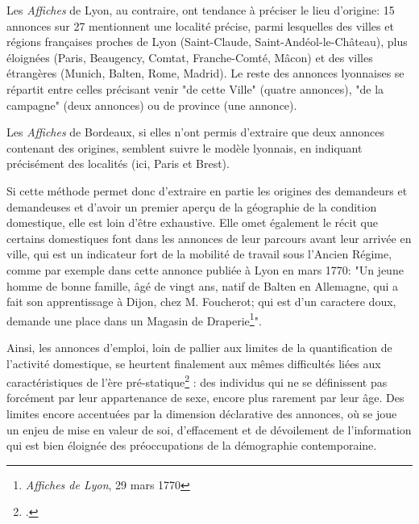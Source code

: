 Les\textit{ Affiches} de Lyon, au contraire, ont tendance à préciser le lieu d'origine: 15 annonces sur 27 mentionnent une localité précise, parmi lesquelles des villes et régions françaises proches de Lyon (Saint-Claude, Saint-Andéol-le-Château), plus éloignées (Paris,  Beaugency, Comtat, Franche-Comté, Mâcon) et des villes étrangères (Munich, Balten, Rome, Madrid). Le reste des annonces lyonnaises se répartit entre celles précisant venir "de cette Ville" (quatre annonces), "de la campagne" (deux annonces) ou de province (une annonce).

Les \textit{Affiches} de Bordeaux, si elles n'ont permis d'extraire que deux annonces contenant des origines, semblent suivre le modèle lyonnais, en indiquant précisément des localités (ici, Paris et Brest). 


Si cette méthode permet donc d'extraire en partie les origines des demandeurs et demandeuses et d'avoir un premier aperçu de la géographie de la condition domestique, elle est loin d'être exhaustive. Elle omet également le récit que certains domestiques font dans les annonces de leur parcours avant leur arrivée en ville, qui est un indicateur fort de la mobilité de travail sous l'Ancien Régime, comme par exemple dans cette annonce publiée à Lyon en mars 1770: "Un jeune homme de bonne famille, âgé de vingt ans, natif de Balten en Allemagne, qui a fait son apprentissage à Dijon, chez M. Foucherot; qui est d'un caractere doux, demande une place dans un Magasin de Draperie\footnote{\textit{Affiches de Lyon}, 29 mars 1770}". 



\bigskip

Ainsi, les annonces d'emploi, loin de pallier aux limites de la quantification de l'activité domestique, se heurtent finalement aux mêmes difficultés liées aux caractéristiques de l'ère pré-statique\footcites{fauve-chamouxSurplusUrbainFemmes1998} : des individus qui ne se définissent pas forcément par leur appartenance de sexe, encore plus rarement par leur âge. Des limites encore accentuées par la dimension déclarative des annonces, où se joue un enjeu de mise en valeur de soi, d'effacement et de dévoilement de l'information qui est bien éloignée des préoccupations de la démographie contemporaine.